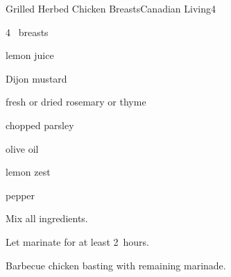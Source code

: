 \begin{recipe}{Grilled Herbed Chicken Breasts}{Canadian Living}{4}

\begin{ingredients}
\item 4~ breasts
\item \C{\half} lemon juice
\item \C{\quarter} Dijon mustard
\item {} fresh or  dried rosemary or thyme
\item {} chopped parsley
\item {} olive oil
\item {} lemon zest
\item \tp{\quarter} pepper
\end{ingredients}

\begin{directions}
\item Mix all ingredients.
\item Let marinate for at least 2~hours.
\item Barbecue chicken basting with remaining marinade.
\end{directions}

\end{recipe}
